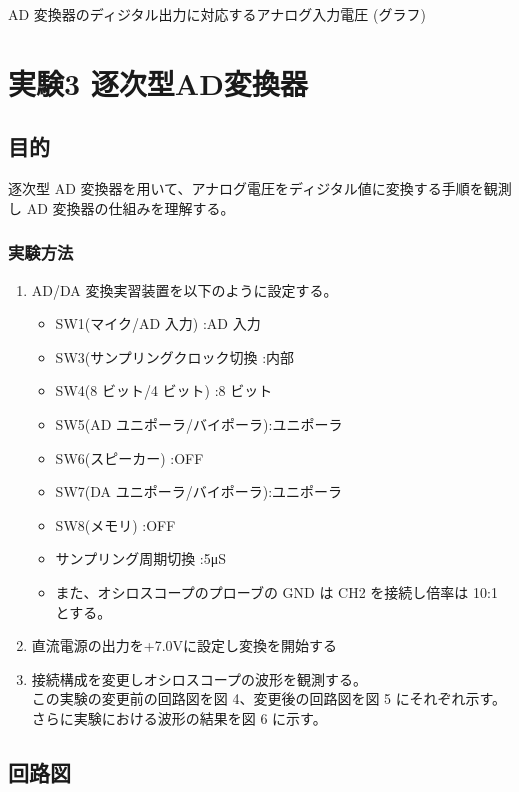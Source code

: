 \documentclass[10pt]{article}
\begin{document}
AD 変換器のディジタル出力に対応するアナログ入力電圧 (グラフ)
\pagebreak

\section{実験3 逐次型AD変換器}
\subsection{目的}
逐次型 AD 変換器を用いて、アナログ電圧をディジタル値に変換する手順を観測し AD 変換器の仕組みを理解する。

\subsubsection{実験方法}
\begin{enumerate}
    \item AD/DA 変換実習装置を以下のように設定する。
        \begin{itemize}
            \item SW1(マイク/AD 入力) :AD 入力 
            \item SW3(サンプリングクロック切換 :内部 
            \item SW4(8 ビット/4 ビット) :8 ビット 
            \item SW5(AD ユニポーラ/バイポーラ):ユニポーラ 
            \item SW6(スピーカー) :OFF 
            \item SW7(DA ユニポーラ/バイポーラ):ユニポーラ 
            \item SW8(メモリ) :OFF
            \item サンプリング周期切換 :5μS
            \item また、オシロスコープのプローブの GND は CH2 を接続し倍率は 10:1 とする。
        \end{itemize}
    \item 直流電源の出力を+7.0Vに設定し変換を開始する
    \item 接続構成を変更しオシロスコープの波形を観測する。\\ この実験の変更前の回路図を図 4、変更後の回路図を図 5 にそれぞれ示す。\\ さらに実験における波形の結果を図 6 に示す。
\end{enumerate}


 
\subsection{回路図}
\end{document}
